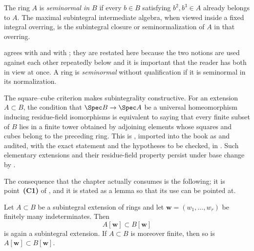 \begin{definition}
\label{def:bj-seminormal-overring}
The ring $A$ is \emph{seminormal in $B$} if every $b\in B$ satisfying
$b^2,b^3\in A$ already belongs to $A$.
The maximal subintegral intermediate algebra, when viewed inside a fixed
integral overring, is the subintegral closure or seminormalization of $A$
in that overring.
\end{definition}

 agrees with 
and  with ; they
are restated here because the two notions are used against each other
repeatedly below and it is important that the reader has both in view at
once.  A ring is \emph{seminormal} without qualification if it is seminormal
in its normalization.

The square--cube criterion makes subintegrality constructive.
For an extension $A\subset B$, the condition that
$\Spec B\to\Spec A$ be a universal homeomorphism inducing residue-field
isomorphisms is equivalent to saying that every finite subset of $B$ lies
in a finite tower obtained by adjoining elements whose squares and cubes
belong to the preceding ring.
This is
\cite[\href{https://stacks.math.columbia.edu/tag/0CND}{Tag 0CND}]
{stacks-project},
imported into the book as  and audited, with the
exact statement and the hypotheses to be checked, in
.
Such elementary extensions and their residue-field property persist under
base change by
\cite[\href{https://stacks.math.columbia.edu/tag/0EUH}{Tag 0EUH}]
{stacks-project}.

The consequence that the chapter actually consumes is the following; it is
point~\textbf{(C1)} of , and it is stated as a lemma so
that its use can be pointed at.

\begin{lemma}
\label{lem:ch44-polynomial-base-change}
Let $A\subset B$ be a subintegral extension of rings and let
$\mathbf w=(w_1,\ldots,w_r)$ be finitely many indeterminates.  Then
\[
 A[\mathbf w]\subset B[\mathbf w]
\]
is again a subintegral extension.  If $A\subset B$ is moreover finite,
then so is $A[\mathbf w]\subset B[\mathbf w]$.
\end{lemma}

